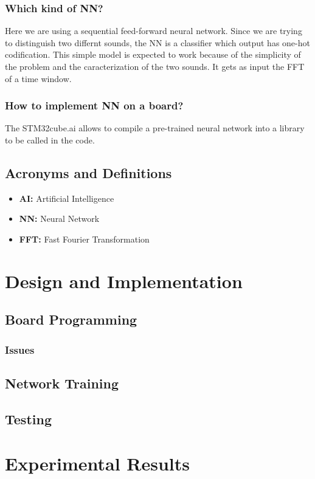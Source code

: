 \subsubsection{Which kind of NN?}
Here we are using a sequential feed-forward neural network. Since we are trying to distinguish two differnt sounds, the NN is a classifier which output has one-hot codification. 
This simple model is expected to work because of the simplicity of the problem and the caracterization of the two sounds. It gets as input the FFT of a time window.
\subsubsection{How to implement NN on a board?}
The STM32cube.ai allows to compile a pre-trained neural network into a library to be called in the code. %

\subsection{Acronyms and Definitions}
\begin{itemize}
 \item \textbf{AI:} Artificial Intelligence
 \item \textbf{NN:} Neural Network
 \item \textbf{FFT:} Fast Fourier Transformation
\end{itemize}


\section{Design and Implementation}
\subsection{Board Programming}
\subsubsection{Issues}
\subsection{Network Training}
\subsection{Testing}

\section{Experimental Results}

